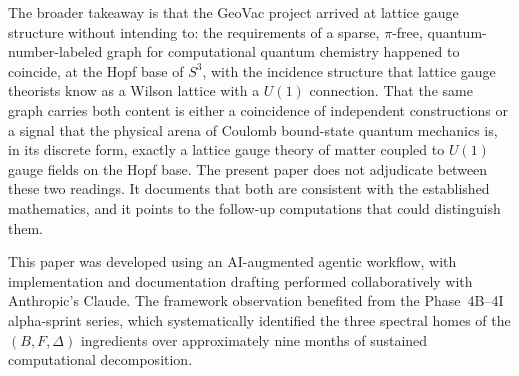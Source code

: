 \documentclass[aps,pra,twocolumn,superscriptaddress,longbibliography]{revtex4-2}
\begin{document}
The broader takeaway is that the GeoVac project arrived at
lattice gauge structure without intending to: the requirements of a
sparse, $\pi$-free, quantum-number-labeled graph for computational
quantum chemistry happened to coincide, at the Hopf base of $S^3$,
with the incidence structure that lattice gauge theorists know as a
Wilson lattice with a $U(1)$ connection.  That the same graph
carries both content is either a coincidence of independent
constructions or a signal that the physical arena of Coulomb
bound-state quantum mechanics is, in its discrete form, exactly a
lattice gauge theory of matter coupled to $U(1)$ gauge fields on
the Hopf base.  The present paper does not adjudicate between these
two readings.  It documents that both are consistent with the
established mathematics, and it points to the follow-up computations
that could distinguish them.


\begin{acknowledgments}
This paper was developed using an AI-augmented agentic workflow, with
implementation and documentation drafting performed collaboratively
with Anthropic's Claude.  The framework observation benefited from
the Phase~4B--4I alpha-sprint series, which systematically identified
the three spectral homes of the $(B, F, \Delta)$ ingredients over
approximately nine months of sustained computational decomposition.
\end{acknowledgments}

\end{document}
